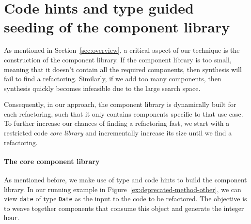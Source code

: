 \documentclass[sigconf,review,anonymous]{acmart}
\begin{document}

\section{{\bf Code hints and type guided seeding of the component library}}\label{sec:components-seeding}
As mentioned in Section~\ref{sec:overview}, a critical aspect of our technique is the construction
of the component library. 
If the component library is too small, meaning that it doesn't contain all
the required components, then synthesis will fail to find a refactoring.
Similarly, if we add too many components, then synthesis quickly becomes infeasible
due to the large search space.

Consequently, in our approach, the component library is dynamically built for each refactoring,
such that it only contains components specific to that use case.
To further increase our chances of finding a refactoring fast, we start with a restricted code  {\em core library} and incrementally increase its size until we find a refactoring.


\paragraph{The core component library}
As mentioned before, we make use of type and code hints to build the component library.
In our running example in Figure~\ref{ex:deprecated-method-other}, we can view \texttt{date} of type \texttt{Date} as the input to the code to be refactored. The objective is to weave together components that consume this object and generate the integer \texttt{hour}.
\end{document}

